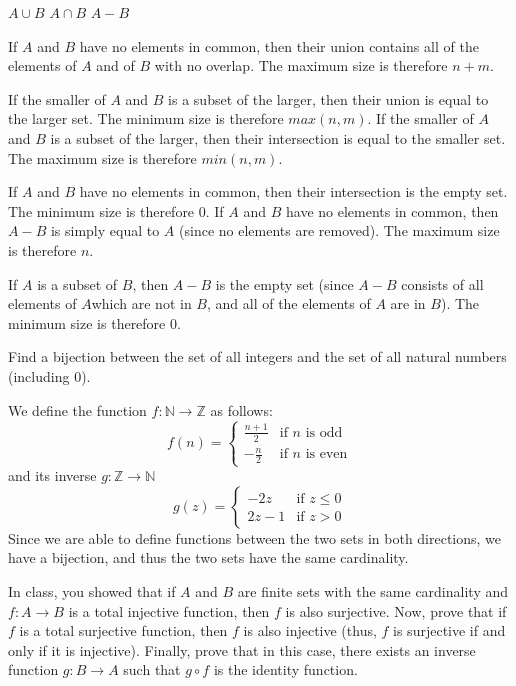 \documentclass[solution, letterpaper]{cs20}
\begin{document}
\subproblem $A \cup B$
\subproblem $A \cap B$
\subproblem $A - B$
 
\begin{solution}
\subsolution If $A$ and $B$ have no elements in common, then their union contains all of the elements of $A$ and of $B$ with no overlap. The maximum size is therefore $n + m$. 

\noindent If the smaller of $A$ and $B$ is a subset of the larger, then their union is equal to the larger set. The minimum size is therefore $max(n, m)$.
\subsolution If the smaller of $A$ and $B$ is a subset of the larger, then their intersection is equal to the smaller set. The maximum size is therefore $min(n, m)$.

\noindent If $A$ and $B$ have no elements in common, then their intersection is the empty set. The minimum size is therefore 0.
\subsolution If $A$ and $B$ have no elements in common, then $A - B$ is simply equal to $A$ (since no elements are removed). The maximum size is therefore $n$.

\noindent If $A$ is a subset of $B$, then $A - B$ is the empty set (since $A - B$ consists of all elements of $A$which are not in $B$, and all of the elements of $A$ are in $B$). The minimum size is therefore 0.
\end{solution}

Find a bijection between the set of all integers and the set of all natural numbers (including 0). 

\begin{solution}
We define the function $f:\mathbb{N} \to \mathbb{Z}$ as follows: 
$$f(n) = \begin{cases} \frac{n+1}{2} & \mbox{if }n\mbox{ is odd} \\ -\frac{n}{2} & \mbox{if }n\mbox{ is even} \end{cases}$$
and its inverse $g:\mathbb{Z} \to \mathbb{N}$
$$g(z) = \begin{cases} -2z & \mbox{if }z \leq 0 \\ 2z-1& \mbox{if }z > 0 \end{cases}$$
Since we are able to define functions between the two sets in both directions, we have a bijection, and thus the two sets have the same cardinality.
\end{solution}
 
 
In class, you showed that if $A$ and $B$ are finite sets with the same cardinality and $f : A \rightarrow B$ is a total injective function, then $f$ is also surjective. 
\subproblem 
Now, prove that if $f$ is a total surjective function, then $f$ is also injective (thus, $f$ is surjective if and only if it is injective).
\subproblem
Finally, prove that in this case, there exists an inverse function $g : B \rightarrow A$ such that $g \circ f$ is the identity function.
\end{document}
